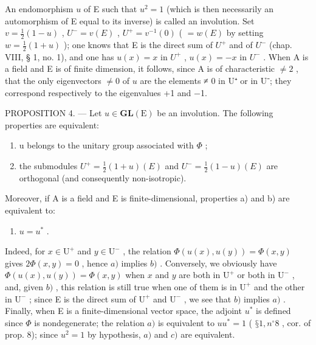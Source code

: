 An endomorphism \(u\) of E such that \(u^2 = 1\) (which is then necessarily an automorphism of E equal to its inverse) is called an involution. Set \(v = \frac{1}{2}(1 - u)\) , \(U^- = v(E)\) , \(U^+ = v^{-1}(0)\) ( \(= w(E)\) by setting \(w = \frac{1}{2}(1 + u)\) ); one knows that E is the direct sum of \(U^+\) and of \(U^-\) (chap. VIII, § 1, no. 1), and one has \(u(x) = x\) in \(U^+\) , \(u(x) = -x\) in \(U^-\) . When A is a field and E is of finite dimension, it follows, since A is of characteristic \(\neq 2\) , that the only eigenvectors \(\neq 0\) of \(u\) are the elements ≠ 0 in U⁺ or in U⁻; they correspond respectively to the eigenvalues +1 and −1.

PROPOSITION 4. --- Let \(u \in \mathbf{GL}(\mathrm{E})\) be an involution. The following properties are equivalent:

\begin{enumerate}
\def\labelenumi{\alph{enumi})}
\item
  u belongs to the unitary group associated with \(\Phi\) ;
\item
  the submodules \(U^{+} = \frac{1}{2}(1 + u)(E)\) and \(U^{-} = \frac{1}{2}(1 - u)(E)\) are orthogonal (and consequently non-isotropic).
\end{enumerate}

Moreover, if A is a field and E is finite-dimensional, properties a) and b) are equivalent to:

\begin{enumerate}
\def\labelenumi{\alph{enumi})}
\setcounter{enumi}{2}
\tightlist
\item
  \(u = u^{*}\) .
\end{enumerate}

Indeed, for \(x \in \mathrm{U}^{+}\) and \(y \in \mathrm{U}^{-}\) , the relation \(\Phi(u(x), u(y)) = \Phi(x, y)\) gives \(2\Phi(x, y) = 0\) , hence \(a)\) implies \(b)\) . Conversely, we obviously have \(\Phi(u(x), u(y)) = \Phi(x, y)\) when \(x\) and \(y\) are both in \(\mathrm{U}^{+}\) or both in \(\mathrm{U}^{-}\) , and, given \(b)\) , this relation is still true when one of them is in \(\mathrm{U}^{+}\) and the other in \(\mathrm{U}^{-}\) ; since E is the direct sum of \(\mathrm{U}^{+}\) and \(\mathrm{U}^{-}\) , we see that \(b)\) implies \(a)\) . Finally, when E is a finite-dimensional vector space, the adjoint \(u^{*}\) is defined since \(\Phi\) is nondegenerate; the relation \(a)\) is equivalent to \(uu^{*} = 1\) ( \(§ 1, n^{\circ} 8\) , cor. of prop. 8); since \(u^{2} = 1\) by hypothesis, \(a)\) and \(c)\) are equivalent.

